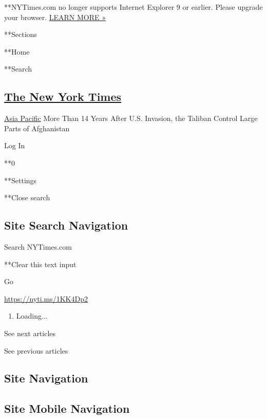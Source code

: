  **NYTimes.com no longer supports Internet Explorer 9 or earlier. Please
upgrade your browser.
\href{http://www.nytimes3xbfgragh.onion/content/help/site/ie9-support.html}{LEARN
MORE »}

**Sections

**Home

**Search

\hypertarget{the-new-york-times}{%
\subsection{\texorpdfstring{\href{http://www.nytimes3xbfgragh.onion/}{The
New York Times}}{The New York Times}}\label{the-new-york-times}}

 \href{/section/world/asia}{Asia Pacific} \textbar{}More Than 14 Years
After U.S. Invasion, the Taliban Control Large Parts of Afghanistan

Log In

**0

**Settings

**Close search

\hypertarget{site-search-navigation}{%
\subsection{Site Search Navigation}\label{site-search-navigation}}

Search NYTimes.com

**Clear this text input

Go

\url{https://nyti.ms/1KK4Dp2}

\begin{enumerate}
\def\labelenumi{\arabic{enumi}.}
\item
  Loading...
\end{enumerate}

See next articles

See previous articles

\hypertarget{site-navigation}{%
\subsection{Site Navigation}\label{site-navigation}}

\hypertarget{site-mobile-navigation}{%
\subsection{Site Mobile Navigation}\label{site-mobile-navigation}}

